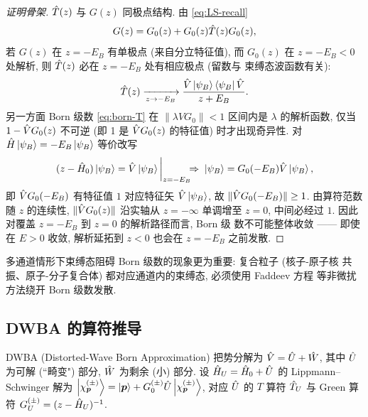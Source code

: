 \begin{proof}[证明骨架]
$\hat{T}(z)$ 与 $G(z)$ 同极点结构. 由 \eqref{eq:LS-recall}
\begin{equation}
G(z)=G_{0}(z)+G_{0}(z)\hat{T}(z)G_{0}(z),
\label{eq:born-G-T-pole}
\end{equation}
若 $G(z)$ 在 $z=-E_{B}$ 有单极点 (来自分立特征值), 而 $G_{0}(z)$ 在
$z=-E_{B}<0$ 处解析, 则 $\hat{T}(z)$ 必在 $z=-E_{B}$ 处有相应极点 (留数与
束缚态波函数有关):
\begin{equation}
\hat{T}(z)\xrightarrow[z\to -E_{B}]{}\frac{\hat{V}\ket{\psi_{B}}\bra{\psi_{B}}\hat{V}}{z+E_{B}}.
\label{eq:born-T-residue}
\end{equation}
另一方面 Born 级数 \eqref{eq:born-T} 在 $\|\lambda VG_{0}\|<1$ 区间内是
$\lambda$ 的解析函数, 仅当 $1-\hat{V} G_{0}(z)$ 不可逆 (即 1 是 $\hat{V} G_{0}(z)$
的特征值) 时才出现奇异性. 对 $\hat{H}\ket{\psi_{B}}=-E_{B}\ket{\psi_{B}}$
等价改写
\begin{equation}
(z-\hat{H}_{0})\ket{\psi_{B}}=\hat{V}\ket{\psi_{B}}\bigg|_{z=-E_{B}}\!\!\!\Rightarrow\;
\ket{\psi_{B}}=G_{0}(-E_{B})\hat{V}\ket{\psi_{B}},
\label{eq:born-bound-eig}
\end{equation}
即 $\hat{V} G_{0}(-E_{B})$ 有特征值 $1$ 对应特征矢
$\hat{V}\ket{\psi_{B}}$, 故 $\|\hat{V} G_{0}(-E_{B})\|\ge 1$. 由算符范数随
$z$ 的连续性, $\|\hat{V} G_{0}(z)\|$ 沿实轴从 $z=-\infty$ 单调增至 $z=0$,
中间必经过 $1$. 因此对覆盖 $z=-E_{B}$ 到 $z=0$ 的解析路径而言, Born 级
数不可能整体收敛 —— 即使在 $E>0$ 收敛, 解析延拓到 $z<0$ 也会在 $z=-E_{B}$
之前发散.
\end{proof}

\begin{remark}
多通道情形下束缚态阻碍 Born 级数的现象更为重要: 复合粒子 (核子-原子核
共振、原子-分子复合体) 都对应通道内的束缚态, 必须使用 Faddeev 方程
等非微扰方法绕开 Born 级数发散.
\end{remark}

\subsection{DWBA 的算符推导}

DWBA (Distorted-Wave Born Approximation) 把势分解为 $\hat{V}=\hat{U}+\hat{W}$,
其中 $\hat{U}$ 为可解 (``畸变") 部分, $\hat{W}$ 为剩余 (小) 部分. 设
$\hat{H}_{U}=\hat{H}_{0}+\hat{U}$ 的 Lippmann--Schwinger 解为
$\ket{\chi^{(\pm)}_{\bm p}}=\ket{\bm p}+G_{0}^{(\pm)}\hat{U}\ket{\chi^{(\pm)}_{\bm p}}$,
对应 $\hat{U}$ 的 $T$ 算符 $\hat{T}_{U}$ 与 Green 算符 $G_{U}^{(\pm)}=(z-\hat{H}_{U})^{-1}$.

